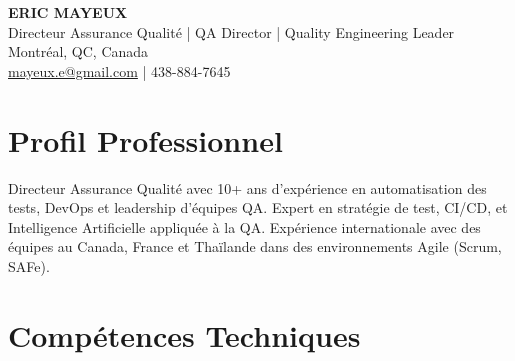 \documentclass[11pt,a4paper]{article}
\begin{document}
\begin{center}
    {\Huge \textbf{ERIC MAYEUX}}\\
    \vspace{3pt}
    {\large Directeur Assurance Qualité | QA Director | Quality Engineering Leader}\\
    \vspace{3pt}
    Montréal, QC, Canada\\
    \href{mailto:mayeux.e@gmail.com}{mayeux.e@gmail.com} | 438-884-7645
\end{center}

\vspace{6pt}

\section*{Profil Professionnel}
\noindent
Directeur Assurance Qualité avec 10+ ans d'expérience en automatisation des tests, DevOps et leadership d'équipes QA. Expert en stratégie de test, CI/CD, et Intelligence Artificielle appliquée à la QA. Expérience internationale avec des équipes au Canada, France et Thaïlande dans des environnements Agile (Scrum, SAFe).

\section*{Compétences Techniques}
\end{document}
